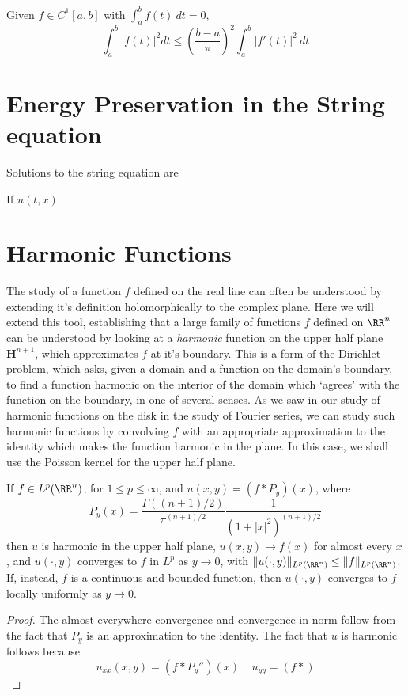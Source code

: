 \begin{corollary}
    Given $f \in C^1[a,b]$ with $\int_a^b f(t)\ dt = 0$,
    \[ \int_a^b |f(t)|^2 dt \leq \left(\frac{b-a}{\pi}\right)^2 \int_a^b |f'(t)|^2\ dt \]
\end{corollary}

\section{Energy Preservation in the String equation}

Solutions to the string equation are

If $u(t,x)$

\section{Harmonic Functions} 

The study of a function $f$ defined on the real line can often be understood by extending it's definition holomorphically to the complex plane. Here we will extend this tool, establishing that a large family of functions $f$ defined on $\RR^n$ can be understood by looking at a {\it harmonic} function on the upper half plane $\mathbf{H}^{n+1}$, which approximates $f$ at it's boundary. This is a form of the Dirichlet problem, which asks, given a domain and a function on the domain's boundary, to find a function harmonic on the interior of the domain which `agrees' with the function on the boundary, in one of several senses. As we saw in our study of harmonic functions on the disk in the study of Fourier series, we can study such harmonic functions by convolving $f$ with an appropriate approximation to the identity which makes the function harmonic in the plane. In this case, we shall use the Poisson kernel for the upper half plane.

\begin{theorem}
    If $f \in L^p(\RR^n)$, for $1 \leq p \leq \infty$, and $u(x,y) = (f * P_y)(x)$, where
    \[ P_y(x) = \frac{\Gamma((n+1)/2)}{\pi^{(n+1)/2}} \frac{1}{(1 + |x|^2)^{(n+1)/2}} \]
    then $u$ is harmonic in the upper half plane, $u(x,y) \to f(x)$ for almost every $x$, and $u(\cdot,y)$ converges to $f$ in $L^p$ as $y \to 0$, with $\| u(\cdot,y) \|_{L^p(\RR^n)} \leq \| f \|_{L^p(\RR^n)}$. If, instead, $f$ is a continuous and bounded function, then $u(\cdot,y)$ converges to $f$ locally uniformly as $y \to 0$.
\end{theorem}
\begin{proof}
    The almost everywhere convergence and convergence in norm follow from the fact that $P_y$ is an approximation to the identity. The fact that $u$ is harmonic follows because
    \[ u_{xx}(x,y) = (f * P_y'')(x)\ \ \ \ \ u_{yy} = (f * ) \]
\end{proof}










